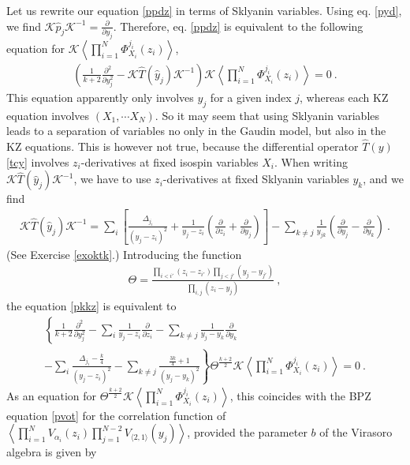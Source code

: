 \documentclass[12pt,a4paper,notitlepage]{report}
\numberwithin{equation}{section}
\theoremstyle{break}
\begin{document}
Let us rewrite our equation \eqref{ppdz} in terms of Sklyanin variables.
Using eq. \eqref{pyd}, we find
$\mathcal{K} \hat{p}_j \mathcal{K}^{-1}= {\frac{\partial}{\partial y_j}} $.
Therefore,  
eq. \eqref{ppdz} is equivalent to the following equation for $\mathcal{K}\left\langle \prod_{i=1}^N \Phi^{j_i}_{X_i}(z_i)\right\rangle$,
\begin{align}
 \left(\frac{1}{k+2}\frac{\partial ^2}{\partial y_j^2} - \mathcal{K} \hat{T}(\hat{y}_j) \mathcal{K}^{-1}\right)\mathcal{K}\left\langle \prod_{i=1}^N \Phi^{j_i}_{X_i}(z_i)\right\rangle  = 0\ .
\label{pkkz}
\end{align}
This equation apparently only involves $y_j$ for a given index $j$, whereas each KZ equation involves $(X_1,\cdots X_N)$. 
So it may seem that using Sklyanin variables leads to a separation of variables no only in the Gaudin model, but also
in the KZ equations. 
This is however not true, because the differential operator $\hat{T}(y)$ \eqref{tcy} involves $z_i$-derivatives at fixed isospin variables $X_i$.
When writing $\mathcal{K} \hat{T}(\hat{y}_j) \mathcal{K}^{-1}$, we have to use $z_i$-derivatives at fixed Sklyanin variables $y_k$, and we find
\begin{align}
\mathcal{K} \hat{T}(\hat{y}_j) \mathcal{K}^{-1} = \sum_i\left[\frac{\Delta_{j_i}}{(y_j-z_i)^2}+ \frac{1}{y_j-z_i}\left({\frac{\partial}{\partial z_i}}+{\frac{\partial}{\partial y_j}}\right)\right]-\sum_{k\neq j}\frac{1}{y_{jk}}\left({\frac{\partial}{\partial y_j}}-{\frac{\partial}{\partial y_k}}\right)\ .
\label{dtyj}
\end{align}
(See Exercise \ref{exoktk}.) 
Introducing the function
\begin{align}
 \Theta = \frac{\prod_{i<i'}(z_i-z_{i'})\prod_{j<j'}(y_j-y_{j'})}{\prod_{i,j}(z_i-y_j)}\ ,
\end{align}
the equation \eqref{pkkz} is equivalent to 
\begin{multline}
 \left\{\frac{1}{k+2}  \frac{\partial^2}{\partial y_j^2} - \sum_i\frac{1}{y_j-z_i}{\frac{\partial}{\partial z_i}} -\sum_{k\neq j}\frac{1}{y_j-y_k} {\frac{\partial}{\partial y_k}}
\right. \\ \left.
 -\sum_i\frac{\Delta_{j_i}-\frac{k}{4}}{(y_j-z_i)^2}  -\sum_{k\neq j}\frac{\frac{3k}{4}+1}{(y_j-y_k)^2}   \right\} \Theta^{\frac{k+2}{2}}\mathcal{K}\left\langle \prod_{i=1}^N \Phi^{j_i}_{X_i}(z_i)\right\rangle = 0\ .
\end{multline}
As an equation for $\Theta^{\frac{k+2}{2}}\mathcal{K}\left\langle \prod_{i=1}^N \Phi^{j_i}_{X_i}(z_i)\right\rangle$,
this coincides with the BPZ equation \eqref{pvot} for the correlation function of $\left\langle \prod_{i=1}^N V_{\alpha_i}(z_i) \prod_{j=1}^{N-2}V_{\langle 2,1\rangle}(y_j)\right\rangle$, provided the parameter $b$ of the Virasoro algebra is given by 
\end{document}
